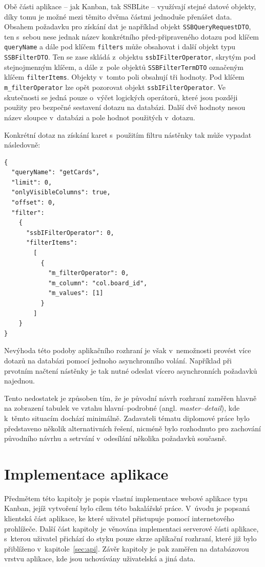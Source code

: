 Obě části aplikace -- jak Kanban, tak SSBLite -- využívají stejné datové objekty, díky tomu je možné mezi těmito dvěma částmi jednoduše přenášet data. Obsahem požadavku pro získání dat je například objekt \texttt{SSBQueryRequestDTO}, ten s~sebou nese jednak název konkrétního před-připraveného dotazu pod klíčem \texttt{queryName} a dále pod klíčem \texttt{filters} může obsahovat i další objekt typu \texttt{SSBFilterDTO}. Ten se zase skládá z~objektu \texttt{ssbIFilterOperator}, skrytým pod stejnojmenným klíčem, a dále z~pole objektů \texttt{SSBFilterTermDTO} označeným klíčem \texttt{filterItems}. Objekty v~tomto poli obsahují tři hodnoty. Pod klíčem \texttt{m\_filterOperator} lze opět pozorovat objekt \texttt{ssbIFilterOperator}. Ve skutečnosti se jedná pouze o~výčet logických operátorů, které jsou později použity pro bezpečné sestavení dotazu na databázi. Další dvě hodnoty nesou název sloupce v~databázi a pole hodnot použitých v~dotazu.

Konkrétní dotaz na získání karet s~použitím filtru nástěnky tak může vypadat následovně:

\begin{verbatim}
{
  "queryName": "getCards",
  "limit": 0,
  "onlyVisibleColumns": true,
  "offset": 0,
  "filter":
    {
      "ssbIFilterOperator": 0,
      "filterItems":
        [
          {
            "m_filterOperator": 0,
            "m_column": "col.board_id",
            "m_values": [1]
          }
        ]
    }
}
\end{verbatim}

Nevýhoda této podoby aplikačního rozhraní je však v~nemožnosti provést více dotazů na databázi pomocí jednoho asynchronního volání. Například při prvotním načtení nástěnky je tak nutné odeslat vícero asynchronních požadavků najednou.

Tento nedostatek je způsoben tím, že je původní návrh rozhraní zaměřen hlavně na zobrazení tabulek ve vztahu hlavní--podrobné (angl. \emph{master--detail}), kde k~těmto situacím dochází minimálně. Zadavateli tématu diplomové práce bylo představeno několik alternativních řešení, nicméně bylo rozhodnuto pro zachování původního návrhu a setrvání v~odesílání několika požadavků současně. 

\chapter{Implementace aplikace}
Předmětem této kapitoly je popis vlastní implementace webové aplikace typu Kanban, jejíž vytvoření bylo cílem této bakalářské práce. V~úvodu je popsaná klientská část aplikace, ke které uživatel přistupuje pomocí internetového prohlížeče. Další část kapitoly je věnována implementaci serverové části aplikace, s~kterou uživatel přichází do styku pouze skrze aplikační rozhraní, které již bylo přiblíženo v~kapitole~\ref{sec:api}. Závěr kapitoly je pak zaměřen na databázovou vrstvu aplikace, kde jsou uchovávány uživatelská a jiná data.



